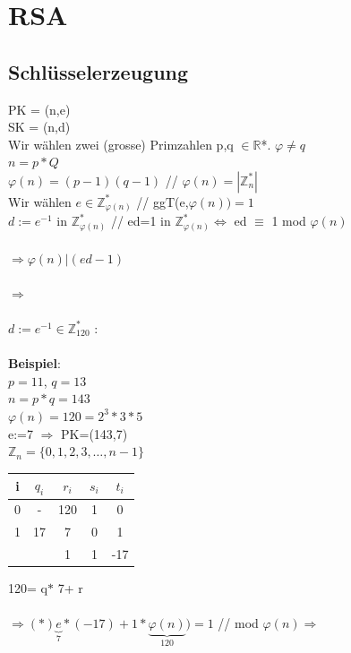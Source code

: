 \documentclass[10pt]{article}
\newcommand{\RN}{\mathbb{R}} %
\newcommand{\ZN}{\mathbb{Z}} %
\begin{document}
\newpage
\section{RSA}
\subsection{Schlüsselerzeugung}
PK = (n,e) \\
SK = (n,d) \\
Wir wählen zwei (grosse) Primzahlen p,q $\in \RN$*. $\varphi\neq q$ \\
$n=p*Q$ \\
$\varphi(n)=(p-1)(q-1)$ {\color{blue}// $\varphi(n) = |\ZN^*_n|$ }\\
{\color{blue}Wir wählen $e \in \ZN^*_{\varphi(n)}$} // ggT(e,$\varphi(n))=1$ \\
{\color{blue} $d:=e^{-1}$ in $\ZN^*_{\varphi(n)}$} // ed=1 in $\ZN^*_{\varphi(n)} \Leftrightarrow$ ed $\equiv$ 1 mod $\varphi(n)$\\ \\
$\Longrightarrow\varphi(n) | (ed-1)$\\ \\
$\Longrightarrow$ \fbox{$\exists k \in \ZN:e{\color{red}*d}+{\color{red}k*}\varphi(n))=1$} \\ \\
$d:=e^{-1}\in \ZN^*_{120}$ :  \\
\\
\textbf{Beispiel}: \\
$p=11$, $q=13$ \\
$n=p*q=143$ \\
$\varphi(n)=120=2^3*3*5$ \\
{\color{blue} e:=7} $\Rightarrow$ PK=(143,7) \\
$\ZN_n=\{0,1,2,3,\dots,n-1\}$ \\

\begin{tabular}{| c | c | c | c | c |}
	\hline
	i & $q_i$ & $r_i$ & $s_i$ & $t_i$ \\
	\hline
	0 & - & {\color{blue} 120} & {\color{red} 1} & {\color{red} 0} \\
	1 & {\color{red} 17} & {\color{blue} 7} & {\color{red} 0} & {\color{red} 1}\\
	\hline
	&&{\color{red} 1}&{\color{red} 1}&{\color{red} -17} \\
	\hline
\end{tabular} {\color{blue} 120=}{\color{red} q}$*${\color{blue} 7+}{\color{red} r} \\ \\
{\color{blue}$\Longrightarrow (*) \underbrace{e}_{7}*(-17)+1*\underbrace{\varphi(n)}_{120})=1$} {\color{red} // mod $\varphi(n) \Rightarrow$ }
\end{document}
